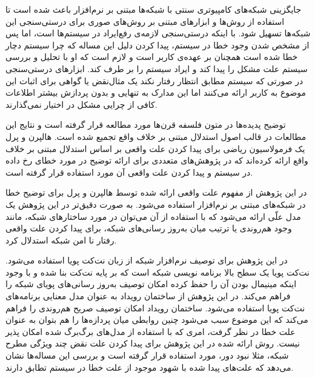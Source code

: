 جایگزینی شبکه‌های کامپیوتری سنتی با شبکه‌ها مبتنی بر نرم‌افزار
باعث شده است تا استفاده از روش‌ها و ابزار‌های مبتنی بر روش‌های صوری
برای درستی‌سنجی
این شبکه‌ها تسهیل شود.
با اینکه درستی‌سنجی لازمه‌ی رفع‌ایراد در سیستم‌ها است، اما پس از مشخص شدن وجود خطا در سیستم، پیدا کردن دلیل این مساله که چرا سیستم دچار خطا شده است همچنان بر عهده‌ی کاربر است و لازم است که او با تحلیل و بررسی سیستم علت مشکل را پیدا کند و ایراد سیستم را بر طرف کند.
ابزار‌های درستی‌سنجی در صورتی که سیستم مطابق انتظار رفتار نکند یک مثال‌نقض یا گواهی برای اثبات این موضوع به کاربر ارائه می‌کنند اما این مدارک به تنهایی و بدون پردازش بیشتر اطلاعات کافی از چرایی مشکل در اختیار نمی‌گذارند.

توضیح پدیده‌ها در متون فلسفه قرن‌ها مورد مطالعه قرار گرفته است و نتایج این مطالعات در قالب اصول استدلال مبتنی بر خلاف واقع
تجمیع شده است.
هالپرن
و پرل
یک فرمولاسیون ریاضی برای پیدا کردن علت واقعی
بر اساس استدلال مبتنی بر خلاف واقع ارائه کرده‌اند که در پژوهش‌های متعددی برای ارائه توضیح در مورد خطای رخ داده در سیستم و پیدا کردن علت واقعی آن مورد استفاده قرار گرفته است.

در این پژوهش از مفهوم علت واقعی ارائه شده توسط هالپرن و پرل برای توضیح خطا در شبکه‌های مبتنی بر نرم‌افزار استفاده می‌شود.
به صورت دقیق‌تر در این پژوهش یک مدل علّی
ارائه می‌شود که با استفاده از آن می‌توان در مورد ساختارهای شبکه، مانند وجود هم‌روندی یا ترتیب میان به‌روز رسانی‌های شبکه، برای پیدا کردن علت واقعی رفتار نا امن شبکه استدلال کرد.

در این پژوهش برای توصیف نرم‌افزار شبکه از زبان نت‌کت‌ پویا
استفاده می‌شود.
نت‌کت پویا یک سطح‌ بالا برنامه‌ نویسی شبکه است که بر پایه نت‌کت
 بنا شده و با وجود اینکه مینیمال بودن آن را حفظ کرده امکان توصیف به‌روز رسانی‌های پویای شبکه را فراهم می‌کند.
در این پژوهش از ساختمان رویداد
به عنوان مدل معنایی
برنامه‌های نت‌کت پویا استفاده می‌شود.
ساختمان رویداد امکان توصیف صریح هم‌روندی را فراهم می‌کند که این موضوع سبب می‌شود چنین روابطی میان پردازه‌ها را هم بتوان به عنوان علت خطا در نظر گرفت، امری که با استفاده از مدل‌های برگ‌برگ شده
امکان پذیر نیست.
روش ارائه شده در این پژوهش برای پیدا کردن علت نقض چند ویژگی مطرح 
شبکه، مثلا نبود دور، مورد استفاده قرار گرفته است و بررسی این مساله‌ها نشان می‌دهد که علت‌های پیدا شده با شهود موجود از علت خطا در سیستم تطابق دارند.
